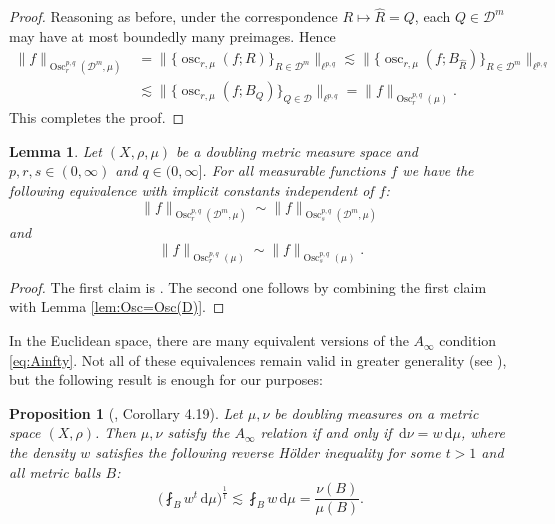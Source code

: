 \documentclass[reqno]{amsart}
\newcommand{\ud}[0]{\,\mathrm{d}}
\newcommand{\Norm}[2]{\|#1\|_{#2}}
\newcommand{\BNorm}[2]{\Big\|#1\Big\|_{#2}}
\theoremstyle{plain}
\newtheorem{proposition}[equation]{Proposition}
\newtheorem{lemma}[equation]{Lemma}
\theoremstyle{definition}
\theoremstyle{remark}
\begin{document}
\begin{proof}
Reasoning as before, under the correspondence $R\mapsto \hat R=Q$, each $Q\in\mathscr D^m$ may have at most boundedly many preimages. Hence
\begin{equation*}
\begin{split}
  \Norm{f}{\operatorname{Osc}^{p,q}_r(\mathscr D^m,\mu)}
  &=\BNorm{\Big\{\operatorname{osc}_{r,\mu}(f;R)\Big\}_{R\in\mathscr D^m}}{\ell^{p,q}}
  \lesssim \BNorm{\Big\{\operatorname{osc}_{r,\mu}(f;B_{\hat R})\Big\}_{R\in\mathscr D^m}}{\ell^{p,q}} \\
  &\lesssim\BNorm{\Big\{\operatorname{osc}_{r,\mu}(f;B_Q)\Big\}_{Q\in\mathscr D}}{\ell^{p,q}}
  =\Norm{f}{\operatorname{Osc}^{p,q}_r(\mu)}.
\end{split}
\end{equation*}
This completes the proof.
\end{proof}

\begin{lemma}\label{lem:Osc(r)=Osc(s)}
Let $(X,\rho,\mu)$ be a doubling metric measure space and $p,r,s\in(0,\infty)$ and $q\in(0,\infty]$.
For all measurable functions $f$ we have the following equivalence with implicit constants independent of $f$:
\begin{equation*}
  \Norm{f}{\operatorname{Osc}^{p,q}_r(\mathscr D^m,\mu)}
  \sim\Norm{f}{\operatorname{Osc}^{p,q}_s(\mathscr D^m,\mu)}
\end{equation*}
and
\begin{equation*}
  \Norm{f}{\operatorname{Osc}^{p,q}_r(\mu)}
  \sim\Norm{f}{\operatorname{Osc}^{p,q}_s(\mu)}.
\end{equation*}
\end{lemma}

\begin{proof}
The first claim is \cite[Proposition 11.3]{Hyt:Sp}. The second one follows by combining the first claim with Lemma \ref{lem:Osc=Osc(D)}.
\end{proof}

In the Euclidean space, there are many equivalent versions of the $A_\infty$ condition \eqref{eq:Ainfty}. Not all of these equivalences remain valid in greater generality (see \cite{KK:11}), but the following result is enough for our purposes:

\begin{proposition}[\cite{KK:11}, Corollary 4.19]\label{prop:KK}
Let $\mu,\nu$ be doubling measures on a metric space $(X,\rho)$. Then $\mu,\nu$ satisfy the $A_\infty$ relation if and only if $\ud\nu=w\ud\mu$, where the density $w$ satisfies the following reverse H\"older inequality for some $t>1$ and all metric balls $B$:
\begin{equation*}
  \Big(\fint_B w^t\ud\mu\Big)^{\frac1t}\lesssim\fint_B w\ud\mu
  =\frac{\nu(B)}{\mu(B)}.
\end{equation*}
\end{proposition}
\end{document}
